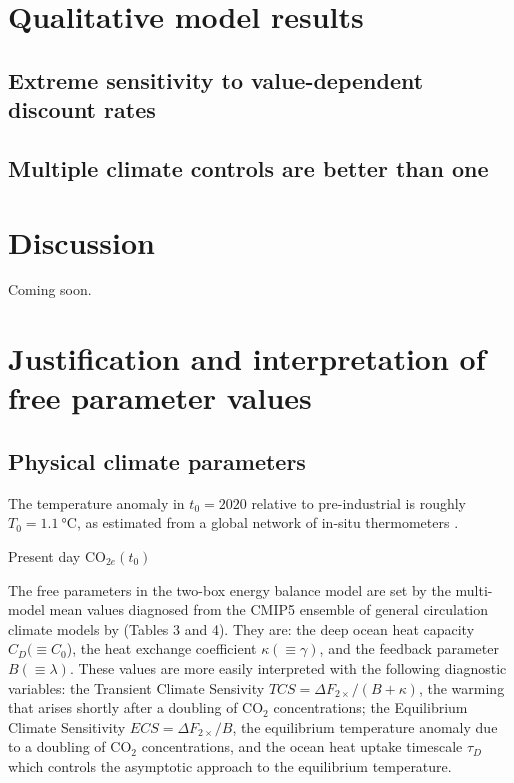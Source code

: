 \documentclass{article}
\begin{document}
\section{Qualitative model results}

\subsection{Extreme sensitivity to value-dependent discount rates}

\subsection{Multiple climate controls are better than one}


\section{Discussion}

Coming soon.


\appendix
\appendixpage
\addappheadtotoc


\section{Justification and interpretation of free parameter values}\label{sec.parameters}

\subsection{Physical climate parameters}
The temperature anomaly in $t_{0}=2020$ relative to pre-industrial is roughly $T_{0} = \SI{1.1}{\celsius}$, as estimated from a global network of in-situ thermometers \citep{lenssen_improvements_2019, nasagisstemp}.

Present day CO$_{2e}(t_{0})$

The free parameters in the two-box energy balance model are set by the multi-model mean values diagnosed from the CMIP5 ensemble of general circulation climate models by \cite{Geoffr} (Tables 3 and 4). They are: the deep ocean heat capacity $C_{D} (\equiv C_{0}$), the heat exchange coefficient $\kappa (\equiv \gamma)$, and the feedback parameter $B (\equiv \lambda)$. These values are more easily interpreted with the following diagnostic variables: the Transient Climate Sensivity $TCS = \Delta F_{2\times}/(B + \kappa)$, the warming that arises shortly after a doubling of CO$_{2}$ concentrations; the Equilibrium Climate Sensitivity $ECS = \Delta F_{2\times}/B$, the equilibrium temperature anomaly due to a doubling of CO$_{2}$ concentrations, and the ocean heat uptake timescale $\tau_{D}$ which controls the asymptotic approach to the equilibrium temperature.
\end{document}
